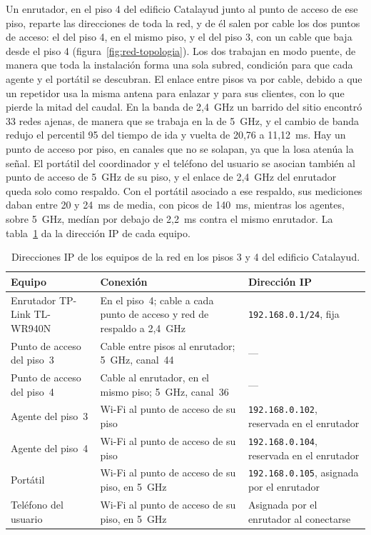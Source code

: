 Un enrutador, en el piso 4 del edificio Catalayud junto al punto de acceso de ese piso, reparte las direcciones de toda la red, y de él salen por cable los dos puntos de acceso: el del piso 4, en el mismo piso, y el del piso 3, con un cable que baja desde el piso 4 (figura~\ref{fig:red-topologia}). Los dos trabajan en modo puente, de manera que toda la instalación forma una sola subred, condición para que cada agente y el portátil se descubran. El enlace entre pisos va por cable, debido a que un repetidor usa la misma antena para enlazar y para sus clientes, con lo que pierde la mitad del caudal. En la banda de 2,4~GHz un barrido del sitio encontró 33 redes ajenas, de manera que se trabaja en la de 5~GHz, y el cambio de banda redujo el percentil 95 del tiempo de ida y vuelta de 20,76 a 11,12~ms. Hay un punto de acceso por piso, en canales que no se solapan, ya que la losa atenúa la señal. El portátil del coordinador y el teléfono del usuario se asocian también al punto de acceso de 5~GHz de su piso, y el enlace de 2,4~GHz del enrutador queda solo como respaldo. Con el portátil asociado a ese respaldo, sus mediciones daban entre 20 y 24~ms de media, con picos de 140~ms, mientras los agentes, sobre 5~GHz, medían por debajo de 2,2~ms contra el mismo enrutador. La tabla~\ref{tab:direcciones-red} da la dirección IP de cada equipo.

\begin{table}[H]
  \centering\footnotesize{}
  \caption{Direcciones IP de los equipos de la red en los pisos 3 y 4 del edificio Catalayud.}
  \label{tab:direcciones-red}
  \begin{tabular}{@{}>{\raggedright\arraybackslash}p{}>{\raggedright\arraybackslash}p{}>{\raggedright\arraybackslash}p{}@{}}
    \toprule
    \textbf{Equipo} & \textbf{Conexión} & \textbf{Dirección IP} \\ \midrule
    Enrutador TP-Link \mbox{TL-WR940N} & En el piso~4; cable a cada punto de acceso y red de respaldo a 2,4~GHz & \texttt{192.168.0.1/24}, fija \\ \addlinespace
    Punto de acceso del piso~3 & Cable entre pisos al enrutador; 5~GHz, canal~44 & --- \\ \addlinespace
    Punto de acceso del piso~4 & Cable al enrutador, en el mismo piso; 5~GHz, canal~36 & --- \\ \addlinespace
    Agente del piso~3 & Wi-Fi al punto de acceso de su piso & \texttt{192.168.0.102}, reservada en el enrutador \\ \addlinespace
    Agente del piso~4 & Wi-Fi al punto de acceso de su piso & \texttt{192.168.0.104}, reservada en el enrutador \\ \addlinespace
    Portátil & Wi-Fi al punto de acceso de su piso, en 5~GHz & \texttt{192.168.0.105}, asignada por el enrutador \\ \addlinespace
    Teléfono del usuario & Wi-Fi al punto de acceso de su piso, en 5~GHz & Asignada por el enrutador al conectarse \\ \bottomrule
  \end{tabular}
\end{table}

